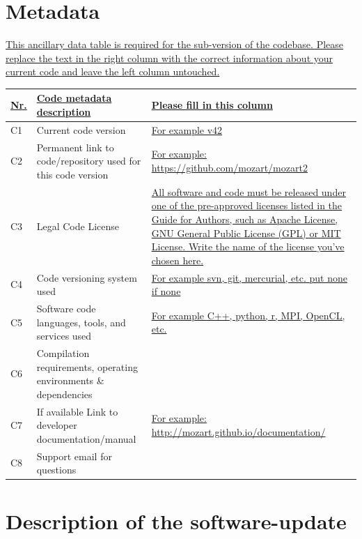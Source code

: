 \documentclass[preprint,12pt, a4paper]{elsarticle}
\begin{document}
\section*{Metadata}
\label{metadata}
\uline{ This ancillary data table is required for the sub-version of the codebase. Please replace the text in the right column with the correct information about your current code and leave the left column untouched. }

\begin{table}[H]
\begin{tabular}{|l|p{6.5cm}|p{6.5cm}|}
\hline
\uline{Nr.} & \uline{Code metadata description} & \uline{Please fill in this column} \\

\hline
C1 & Current code version & \uline{For example v42} \\
\hline
C2 & Permanent link to code/repository used for this code version & \uline{For example:} \url{https://github.com/mozart/mozart2} \\
\hline
C3 & Legal Code License   & \uline{All software and code must be released under one of the pre-approved licenses listed in the Guide for Authors, such as Apache License, GNU General Public License (GPL) or MIT License. Write the name of the license you’ve chosen here.} \\
\hline
C4 & Code versioning system used & \uline{For example svn, git, mercurial, etc. put none if none }\\
\hline
C5 & Software code languages, tools, and services used & \uline{For example C++, python, r, MPI, OpenCL, etc.} \\
\hline
C6 & Compilation requirements, operating environments \& dependencies & \\
\hline
C7 & If available Link to developer documentation/manual & \uline{For example:} \url{http://mozart.github.io/documentation/} \\
\hline
C8 & Support email for questions & \\
\hline
\end{tabular}

 
\end{table}


\linenumbers



\section{Description of the software-update}
\label{Description of the software-update}
\end{document}

